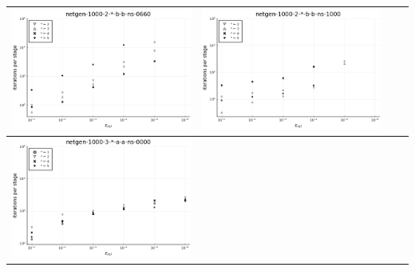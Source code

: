 \documentclass{article}
\begin{document}
\begin{landscape}
\begin{center}
\begin{longtable}{| c | c | c | c |}
\includegraphics[height=0.22\textheight]{itepst_fixlim_netgen-1000-2-_-b-b-ns-0660.png} &
\includegraphics[height=0.22\textheight]{itepst_fixlim_netgen-1000-2-_-b-b-ns-1000.png} \\
                \hline
\includegraphics[height=0.22\textheight]{itepst_fixlim_netgen-1000-3-_-a-a-ns-0000.png} &

\end{longtable}
\end{center}
\end{landscape}
\end{document}

